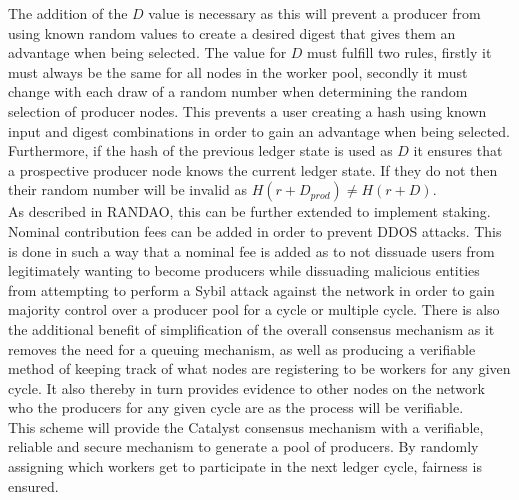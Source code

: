 The addition of the $D$ value is necessary as this will prevent a producer from using known random values to create a desired digest that gives them an advantage when being selected. The value for $D$ must fulfill two rules, firstly it must always be the same for all nodes in the worker pool, secondly it must change with each draw of a random number when determining the random selection of producer nodes. This prevents a user creating a hash using known input and digest combinations in order to gain an advantage when being selected. Furthermore, if the hash of the previous ledger state is used as $D$ it ensures that a prospective producer node knows the current ledger state. If they do not then their random number will be invalid as $H(r + D_{prod}) \neq H(r + D)$. \\

As described in RANDAO\cite{randao}, this can be further extended to implement staking. Nominal contribution fees can be added in order to prevent DDOS attacks. This is done in such a way that a nominal fee is added as to not dissuade users from legitimately wanting to become producers while dissuading malicious entities from attempting to perform a Sybil attack against the network in order to gain majority control over a producer pool for a cycle or multiple cycle. There is also the additional benefit of simplification of the overall consensus mechanism as it removes the need for a queuing mechanism, as well as producing a verifiable method of keeping track of what nodes are registering to be workers for any given cycle. It also thereby in turn provides evidence to other nodes on the network who the producers for any given cycle are as the process will be verifiable. \\

This scheme will provide the Catalyst consensus mechanism with a verifiable, reliable and secure mechanism to generate a pool of producers. By randomly assigning which workers get to participate in the next ledger cycle, fairness is ensured. \\
